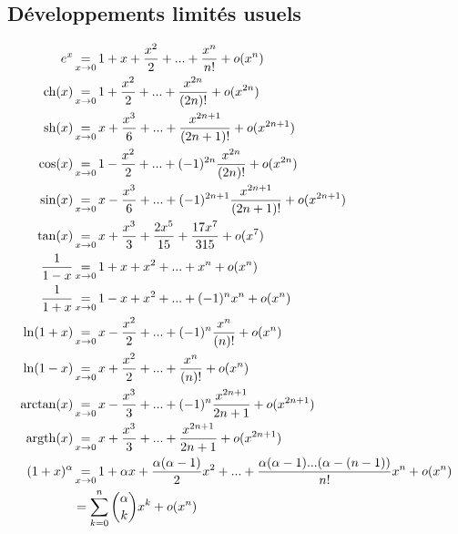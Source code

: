 \def\theme{Statistique à une ou deux variables, représentation et analyse de données}
\def\date{02/12/2023}

\def\eq{&\operatorname*{=}_{x \rightarrow 0}}
\def\ppp{+ ... +}
\newcommand{\pdl}[1]{
    + \dl{#1}\\
}

\hbox{\vspace{-0.7cm}}

\subsection{Développements limités usuels}
\vspace{-1cm}
\begin{align*}
    e^x \eq 1 + x + \frac{x^2}{2} \ppp \frac{x^n}{n!} \pdl{n}
    \ch(x) \eq 1 + \frac{x^2}{2} \ppp \frac{x^{2n}}{(2n)!} \pdl{2n}
    \sh(x) \eq x + \frac{x^3}{6} \ppp \frac{x^{2n+1}}{(2n+1)!} \pdl{2n+1}
    \cos(x) \eq 1 - \frac{x^2}{2} \ppp (-1)^{2n}\frac{x^{2n}}{(2n)!} \pdl{2n}
    \sin(x) \eq x - \frac{x^3}{6} \ppp (-1)^{2n+1}\frac{x^{2n+1}}{(2n+1)!} \pdl{2n+1}
    \tan(x) \eq x + \frac{x^3}{3} + \frac{2x^5}{15} + \frac{17x^7}{315} \pdl{7}
    \frac{1}{1-x} \eq 1 + x + x^2 \ppp x^n \pdl{n}
    \frac{1}{1+x} \eq 1 - x + x^2 \ppp (-1)^{n} x^n \pdl{n}
    \ln(1+x) \eq x - \frac{x^2}{2} \ppp (-1)^{n}\frac{x^{n}}{(n)!} \pdl{n}
    \ln(1-x) \eq x + \frac{x^2}{2} \ppp \frac{x^{n}}{(n)!} \pdl{n}
    \arctan(x) \eq x - \frac{x^3}{3} \ppp (-1)^{n}\frac{x^{2n+1}}{2n+1} \pdl{2n+1}
    \argth(x) \eq x + \frac{x^3}{3} \ppp \frac{x^{2n+1}}{2n+1} \pdl{2n+1}
    (1+x)^\alpha \eq  1 + \alpha x + \frac{\alpha(\alpha-1)}{2}x^2 
    \ppp \frac{\alpha(\alpha-1) ... (\alpha-(n-1))}{n!}x^n \pdl{n}
    &= \sum_{k=0}^{n}\binom{\alpha}{k}x^k \pdl{n}
\end{align*}
